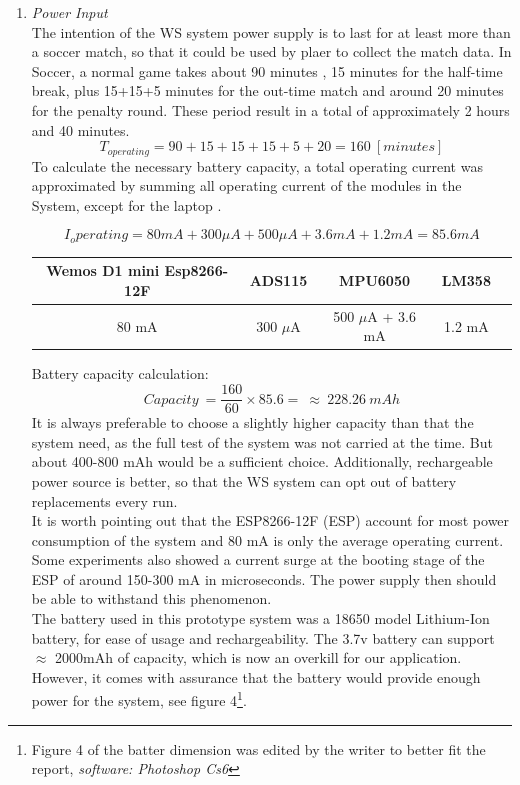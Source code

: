 \documentclass[12pt,a4paper]{article}
\begin{document}
\begin{enumerate}
  \item \textit{Power Input} \\
The intention of the WS system power supply is to last for at least more than a soccer match, so that it could be used by plaer to collect the match data. In Soccer, a normal game takes about 90 minutes \cite{lawOfTheGame}, 15 minutes for the half-time break, plus 15+15+5 minutes for the out-time match and around 20 minutes for the penalty round. These period result in a total of approximately 2 hours and 40 minutes.
\begin{equation}
	T_{operating}=90+15+15+15+5+20=160\:[minutes]
\end{equation}
To calculate the necessary battery capacity, a total operating current was approximated by summing all operating current of the modules in the System, except for the laptop \cite{Esp8266,ADS1115,MPU6050,LM358}. 
\begin{center}
\begin{equation}
I_operating=80mA+300\mu A+500\mu A+3.6mA+1.2mA=85.6mA
\end{equation}
\begin{tabular}{ |c|c|c|c|c|}
\hline
Wemos D1 mini Esp8266-12F & ADS115 & MPU6050 & LM358 \\ 
\hline
80 mA & 300 $\mu$A & 500 $\mu$A + 3.6 mA  & 1.2 mA\\
\hline
\end{tabular}
\end{center}
Battery capacity calculation:
\begin{equation}
	Capacity\:=\frac{160}{60}\times85.6=\:\approx\:228.26\:mAh
\end{equation} 
It is always preferable to choose a slightly higher capacity than that the system need, as the full test of the system was not carried at the time. But about 400-800 mAh would be a sufficient choice. Additionally, rechargeable power source is better, so that the WS system can opt out of battery replacements every run.\\
It is worth pointing out that the ESP8266-12F (ESP) account for most power consumption of the system and 80 mA is only the average operating current. Some experiments also showed a current surge at the booting stage of the ESP \cite{EspPower1}\cite{EspPower2} of around 150-300 mA in microseconds. The power supply then should be able to withstand this phenomenon.\\
The battery used in this prototype system was a 18650 model Lithium-Ion battery, for ease of usage and rechargeability. The 3.7v battery can support $\approx$ 2000mAh of capacity\cite{18650}, which is now an overkill for our application. However, it comes with assurance that the battery would provide enough power for the system, see figure 4\footnote{Figure 4 of the batter dimension was edited by the writer to better fit the report, \textit{software: Photoshop Cs6}}.


\end{enumerate}
\end{document}
